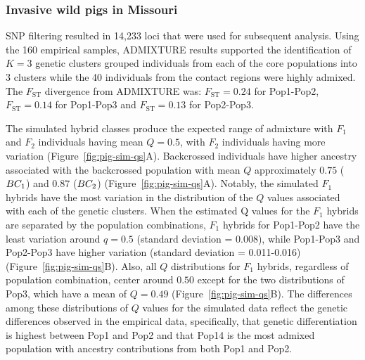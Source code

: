 {\subsubsection*{Invasive wild pigs in Missouri}

SNP filtering resulted in 14,233 loci that were used for subsequent analysis.
Using the 160 empirical samples, ADMIXTURE results supported the identification of
$K=3$ genetic clusters grouped individuals from each of the core populations into 3 clusters
while the 40 individuals from the contact regions were highly admixed. The
$F_\mathrm{ST}$ divergence from ADMIXTURE was:
$F_\mathrm{ST} = 0.24$ for Pop1-Pop2,
$F_\mathrm{ST} = 0.14$ for Pop1-Pop3 and
$F_\mathrm{ST} = 0.13$ for Pop2-Pop3.

The simulated hybrid classes produce
the expected range of admixture with $F_1$ and $F_2$ individuals having mean $Q=0.5$, with $F_2$ individuals having
more variation (Figure~\ref{fig:pig-sim-qs}A).
Backcrossed individuals have higher ancestry associated with the backcrossed population with mean $Q$
approximately $0.75$ ($BC_1$) and $0.87$ ($BC_2$) (Figure~\ref{fig:pig-sim-qs}A). Notably, the simulated
$F_1$ hybrids have the most variation in the distribution of the $Q$ values associated with each of the genetic clusters.
When the estimated Q values for the $F_1$ hybrids are separated by the population combinations,
$F_1$ hybrids for Pop1-Pop2 have the least variation around $q=0.5$ (standard deviation
= 0.008), while Pop1-Pop3 and Pop2-Pop3
have higher variation (standard deviation = 0.011-0.016) (Figure~\ref{fig:pig-sim-qs}B). Also, all $Q$
distributions for $F_1$ hybrids, regardless of population combination, center around
$0.50$ except for the two distributions
of Pop3, which have a mean of $Q=0.49$ (Figure~\ref{fig:pig-sim-qs}B).
The differences among these
distributions of $Q$ values for the simulated data reflect the genetic differences observed
in the empirical data, specifically, that genetic differentiation is highest between Pop1 and Pop2 and that
Pop14 is the most admixed population with ancestry contributions from both Pop1 and Pop2.


}
